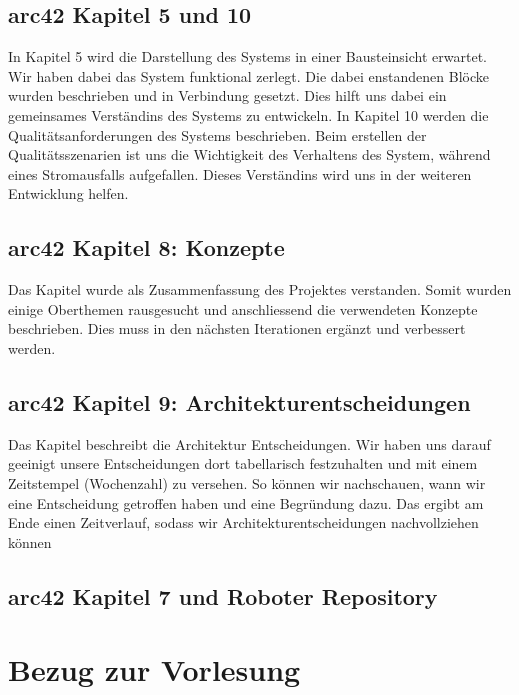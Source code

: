 \documentclass{article}
\begin{document}
\subsection{arc42 Kapitel 5 und 10}
In Kapitel 5 wird die Darstellung des Systems in einer Bausteinsicht erwartet. Wir haben dabei das System funktional zerlegt. Die dabei enstandenen Blöcke wurden beschrieben und in Verbindung gesetzt. Dies hilft uns dabei ein gemeinsames Verständins des Systems zu entwickeln. 
In Kapitel 10 werden die Qualitätsanforderungen des Systems beschrieben. Beim erstellen der Qualitätsszenarien ist uns die Wichtigkeit des Verhaltens des System, während eines Stromausfalls aufgefallen. Dieses Verständins wird uns in der weiteren Entwicklung helfen. 

\subsection{arc42 Kapitel 8: Konzepte}
Das Kapitel wurde als Zusammenfassung des Projektes verstanden. Somit wurden einige Oberthemen rausgesucht und anschliessend die verwendeten Konzepte beschrieben. Dies muss in den nächsten Iterationen ergänzt und verbessert werden.

\subsection{arc42 Kapitel 9: Architekturentscheidungen}
Das Kapitel  beschreibt die Architektur Entscheidungen. Wir haben uns darauf geeinigt unsere Entscheidungen dort tabellarisch festzuhalten und mit einem Zeitstempel (Wochenzahl) zu versehen. So können wir nachschauen, wann wir eine Entscheidung getroffen haben und eine Begründung dazu. Das ergibt am Ende einen Zeitverlauf, sodass wir Architekturentscheidungen nachvollziehen können


\subsection{arc42 Kapitel 7 und Roboter Repository}



\section{Bezug zur Vorlesung}

 
\end{document}
